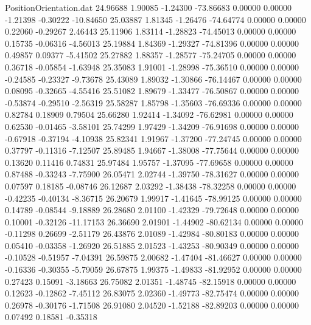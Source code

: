 \begin{filecontents}{PositionOrientation.dat}
  24.96688    1.90085   -1.24300   -73.86683    0.00000    0.00000   -1.21398   -0.30222  -10.84650
  25.03887    1.81345   -1.26476   -74.64774    0.00000    0.00000    0.22060   -0.29267    2.46443
  25.11906    1.83114   -1.28823   -74.45013    0.00000    0.00000    0.15735   -0.06316   -4.56013
  25.19884    1.84369   -1.29327   -74.81396    0.00000    0.00000    0.49857    0.09377   -5.41502
  25.27882    1.88357   -1.28577   -75.24705    0.00000    0.00000    0.36718   -0.05854   -1.63948
  25.35083    1.91001   -1.28998   -75.36510    0.00000    0.00000   -0.24585   -0.23327   -9.73678
  25.43089    1.89032   -1.30866   -76.14467    0.00000    0.00000    0.08095   -0.32665   -4.55416
  25.51082    1.89679   -1.33477   -76.50867    0.00000    0.00000   -0.53874   -0.29510   -2.56319
  25.58287    1.85798   -1.35603   -76.69336    0.00000    0.00000    0.82784    0.18909    0.79504
  25.66280    1.92414   -1.34092   -76.62981    0.00000    0.00000    0.62530   -0.01465   -3.58101
  25.74299    1.97429   -1.34209   -76.91698    0.00000    0.00000   -0.67918   -0.37194   -4.10938
  25.82341    1.91967   -1.37200   -77.24745    0.00000    0.00000    0.37797   -0.11316   -7.12507
  25.89485    1.94667   -1.38008   -77.75644    0.00000    0.00000    0.13620    0.11416    0.74831
  25.97484    1.95757   -1.37095   -77.69658    0.00000    0.00000    0.87488   -0.33243   -7.75900
  26.05471    2.02744   -1.39750   -78.31627    0.00000    0.00000    0.07597    0.18185   -0.08746
  26.12687    2.03292   -1.38438   -78.32258    0.00000    0.00000   -0.42235   -0.40134   -8.36715
  26.20679    1.99917   -1.41645   -78.99125    0.00000    0.00000    0.14789   -0.08544   -9.18889
  26.28680    2.01100   -1.42329   -79.72648    0.00000    0.00000    0.10001   -0.32126  -11.17153
  26.36690    2.01901   -1.44902   -80.62134    0.00000    0.00000   -0.11298    0.26699   -2.51179
  26.43876    2.01089   -1.42984   -80.80183    0.00000    0.00000    0.05410   -0.03358   -1.26920
  26.51885    2.01523   -1.43253   -80.90349    0.00000    0.00000   -0.10528   -0.51957   -7.04391
  26.59875    2.00682   -1.47404   -81.46627    0.00000    0.00000   -0.16336   -0.30355   -5.79059
  26.67875    1.99375   -1.49833   -81.92952    0.00000    0.00000    0.27423    0.15091   -3.18663
  26.75082    2.01351   -1.48745   -82.15918    0.00000    0.00000    0.12623   -0.12862   -7.45112
  26.83075    2.02360   -1.49773   -82.75474    0.00000    0.00000    0.26978   -0.30176   -1.71508
  26.91080    2.04520   -1.52188   -82.89203    0.00000    0.00000    0.07492    0.18581   -0.35318

\end{filecontents}
